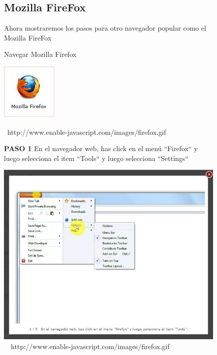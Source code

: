 \documentclass[11pt]{article} %
\begin{document}
\begin{figure}
\subsection{Mozilla FireFox}

Ahora mostraremos los pasos para otro navegador popular como el Mozilla FireFox
\begin{center}
\begin{center}
Navegar Mozilla Firefox

\end{center}
\begin{center}
\includegraphics[height=3 cm, width=3 cm] {imagenes/firefox.JPG}
\end{center}



\ {http://www.enable-javascript.com/images/firefox.gif }

\begin{center}

\textbf{  PASO 1 }
En el navegador web, has click en el menú ``Firefox`` y luego selecciona el item ``Tools``
y luego selecciona ``Settings``
\end{center}

\includegraphics[height=8 cm, width=8 cm] {imagenes/firefox 01.JPG}
\newline
\newline
\
\ {http://www.enable-javascript.com/images/firefox.gif }


\end{center}
\end{figure}
\end{document}
